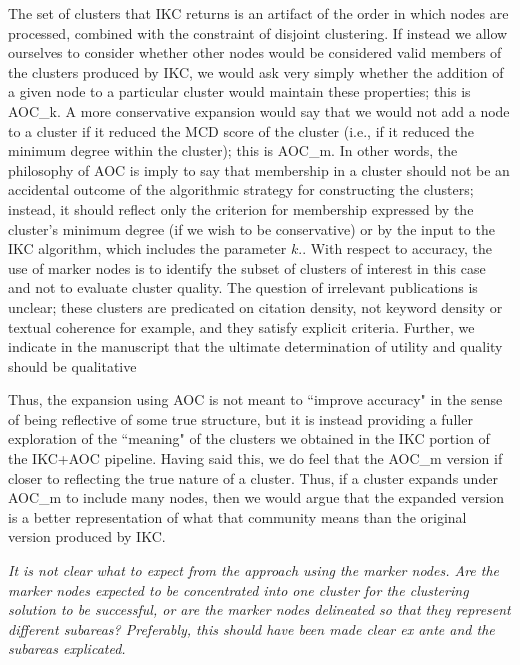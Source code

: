 \documentclass[11pt, oneside]{article}   	%
\begin{document}
{The set of clusters that IKC returns is an artifact of the order in which nodes are processed, combined with the constraint of disjoint clustering. If instead we allow ourselves to consider whether other nodes would be considered valid members of the clusters produced by IKC, we would ask very simply whether the addition of a given node to a particular cluster would maintain these properties; this is AOC\_k.  A more conservative expansion would say that we would not add a node to a cluster if it reduced the MCD score of the cluster (i.e., if it reduced the minimum degree within the cluster); this is AOC\_{m}.  In other words, the philosophy of AOC is imply to say that membership in a cluster should not be an accidental outcome of the algorithmic strategy for constructing the clusters; instead, it should reflect only the criterion for membership expressed by the cluster's minimum degree (if we wish to be conservative) or by the input to the IKC algorithm, which includes the parameter $k$.}. With respect to accuracy, the  use of marker nodes is to identify the subset of clusters of interest in this case and not to evaluate cluster quality. The question of irrelevant publications is unclear; these clusters are predicated on citation density, not keyword density or textual coherence for example, and they satisfy explicit criteria. Further, we indicate in the manuscript that the ultimate determination of utility and quality should be qualitative 

Thus, the expansion using AOC is not meant to ``improve accuracy" in the sense of being reflective of some true structure, but it is instead providing a fuller exploration of the ``meaning" of the clusters we obtained in the IKC portion of the IKC+AOC pipeline.  Having said this, we do feel that the AOC\_{m} version if closer to reflecting the true nature of a cluster. Thus, if a cluster expands under AOC\_{m}  to include many nodes, then we would argue that the expanded version  is a better representation of what that community means than the original version produced by IKC. 

\vspace{2 mm}  
\emph{It is not clear what to expect from the approach using the marker nodes. Are the marker nodes expected to be concentrated into one cluster for the clustering solution to be successful, or are the marker nodes delineated so that they represent different subareas? Preferably, this should have been made clear ex ante and the subareas explicated.}
\end{document}
